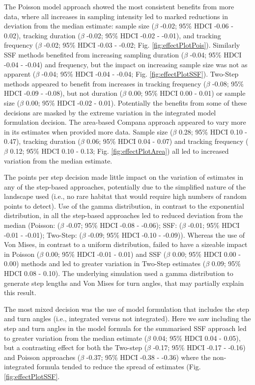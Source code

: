 \documentclass[10pt,a4paper]{article}
\begin{document}
The Poisson model approach showed the most consistent benefits from more data, where all increases in sampling intensity led to marked reductions in deviation from the median estimate: sample size (\(\beta\) -0.02; 95\% HDCI -0.06 - 0.02), tracking duration (\(\beta\) -0.02; 95\% HDCI -0.02 - -0.01), and tracking frequency (\(\beta\) -0.02; 95\% HDCI -0.03 - -0.02; Fig. \ref{fig:effectPlotPois}).
Similarly SSF methods benefited from increasing sampling duration (\(\beta\) -0.04; 95\% HDCI -0.04 - -0.04) and frequency, but the impact on increasing sample size was not as apparent (\(\beta\) -0.04; 95\% HDCI -0.04 - -0.04; Fig. \ref{fig:effectPlotSSF}).
Two-Step methods appeared to benefit from increases in tracking frequency (\(\beta\) -0.08; 95\% HDCI -0.09 - -0.08), but not duration (\(\beta\) 0.00; 95\% HDCI 0.00 - 0.01) or sample size (\(\beta\) 0.00; 95\% HDCI -0.02 - 0.01).
Potentially the benefits from some of these decisions are masked by the extreme variation in the integrated model formulation decision.
The area-based Compana approach appeared to vary more in its estimates when provided more data.
Sample size (\(\beta\) 0.28; 95\% HDCI 0.10 - 0.47), tracking duration (\(\beta\) 0.06; 95\% HDCI 0.04 - 0.07) and tracking frequency (\(\beta\) 0.12; 95\% HDCI 0.10 - 0.13; Fig. \ref{fig:effectPlotArea}) all led to increased variation from the median estimate.

The points per step decision made little impact on the variation of estimates in any of the step-based approaches, potentially due to the simplified nature of the landscape used (i.e., no rare habitat that would require high numbers of random points to detect).
Use of the gamma distribution, in contrast to the exponential distribution, in all the step-based approaches led to reduced deviation from the median (Poisson: (\(\beta\) -0.07; 95\% HDCI -0.08 - -0.06); SSF: (\(\beta\) -0.01; 95\% HDCI -0.01 - -0.01); Two-Step: (\(\beta\) -0.09; 95\% HDCI -0.10 - -0.09)).
Whereas the use of Von Mises, in contrast to a uniform distribution, failed to have a sizeable impact in Poisson (\(\beta\) 0.00; 95\% HDCI -0.01 - 0.01) and SSF (\(\beta\) 0.00; 95\% HDCI 0.00 - 0.00) methods and led to greater variation in Two-Step estimates (\(\beta\) 0.09; 95\% HDCI 0.08 - 0.10).
The underlying simulation used a gamma distribution to generate step lengths and Von Mises for turn angles, that may partially explain this result.

The most mixed decision was the use of model formulation that includes the step and turn angles (i.e., integrated versus not integrated).
Here we saw including the step and turn angles in the model formula for the summarised SSF approach led to greater variation from the median estimate (\(\beta\) 0.04; 95\% HDCI 0.04 - 0.05), but a contrasting effect for both the Two-step (\(\beta\) -0.17; 95\% HDCI -0.17 - -0.16) and Poisson approaches (\(\beta\) -0.37; 95\% HDCI -0.38 - -0.36) where the non-integrated formula tended to reduce the spread of estimates (Fig. \ref{fig:effectPlotSSF}.
\end{document}
